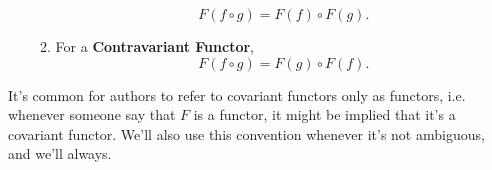 \begin{definition}[Functor]
\begin{enumerate}[(i)]
\begin{enumerate}
\begin{displaymath}
            F(f \circ g) = F(f) \circ F(g).
          \end{displaymath}
        \item For a \textbf{Contravariant Functor},
          \begin{displaymath}
            F(f \circ g) = F(g) \circ F(f).
          \end{displaymath}
      \end{enumerate}
  \end{enumerate}
  It's common for authors to refer to covariant functors only as functors, i.e.
  whenever someone say that $F$ is a functor, it might be implied that it's a covariant functor.
  We'll also use this convention whenever it's not ambiguous, and we'll always.
\end{definition}

